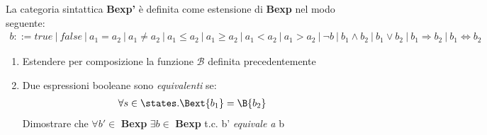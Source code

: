 {
La categoria sintattica \textbf{Bexp'} è definita come estensione di 
\textbf{Bexp} nel modo seguente:
\begin{align*}
b ::= true \
| \ false \ 
| \ a_1 = a_2 \
| \ a_1 \not = a_2 \
| \ a_1 \leq a_2 \
| \ a_1 \geq a_2 \
| \ a_1 < a_2 \
| \ a_1 > a_2 \
| \ \lnot b \
| \ b_1 \land b_2 \
| \ b_1 \lor b_2 \
| \ b_1 \Rightarrow b_2 \
| \ b_1 \Leftrightarrow b_2    
\end{align*}
\begin{enumerate}[label=\alph*)]
  \item Estendere per composizione la funzione $\mathcal{B}$ definita 
precedentemente
  \item Due espressioni booleane sono \textit{equivalenti} se:
    \begin{align*}
      \forall s \in \states.\Bext{b_1} = \B{b_2}
    \end{align*}
    Dimostrare che $\forall b' \in$ \textbf{Bexp} $\exists b \in$
\textbf{Bexp} t.c. b' \textit{equivale a} b
\end{enumerate}
}%
